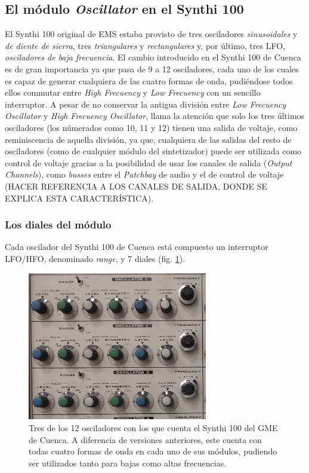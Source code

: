 \subsection{El módulo \textit{Oscillator} en el Synthi 100}

El Synthi 100 original de EMS estaba provisto de tres osciladores \textit{sinusoidales} y \textit{de diente de sierra}, tres \textit{triangulares} y \textit{rectangulares} y, por último, tres LFO, \textit{osciladores de baja frecuencia}. El cambio introducido en el Synthi 100 de Cuenca es de gran importancia ya que pasa de 9 a 12 osciladores, cada uno de los cuales es capaz de generar cualquiera de las cuatro formas de onda, pudiéndose todos ellos commutar entre \textit{High Frecuency} y \textit{Low Frecuency} con un sencillo interruptor. A pesar de no conservar la antigua división entre \textit{Low Frecuency Oscillator} y \textit{High Frecuency Oscillator}, llama la atención que solo los tres últimos osciladores (los númerados como 10, 11 y 12) tienen una salida de voltaje, como reminiscencia de aquella división, ya que, cualquiera de las salidas del resto de osciladores (como de cualquier módulo del sintetizador) puede ser utilizada como control de voltaje gracias a la posibilidad de usar los canales de salida (\textit{Output Channels}), como \textit{busses} entre el \textit{Patchbay} de audio y el de control de voltaje (HACER REFERENCIA A LOS CANALES DE SALIDA, DONDE SE EXPLICA ESTA CARACTERÍSTICA).



\subsubsection{Los diales del módulo}

Cada oscilador del Synthi 100 de Cuenca está compuesto un interruptor LFO/HFO, denominado \textit{range}, y 7 diales (fig. \ref{fig:osciladores}).

\begin{figure}
	\centering
	\includegraphics[width=0.7\textwidth]{images/osciladores}
	\caption[Osciladores del Synthi 100 del GME]{Tres de los 12 osciladores con los que cuenta el Synthi 100 del GME de Cuenca. A diferencia de versiones anteriores, este cuenta con todas cuatro formas de onda en cada uno de sus módulos, pudiendo ser utilizados tanto para bajas como altas frecuencias.}
	\label{fig:osciladores}
\end{figure}

